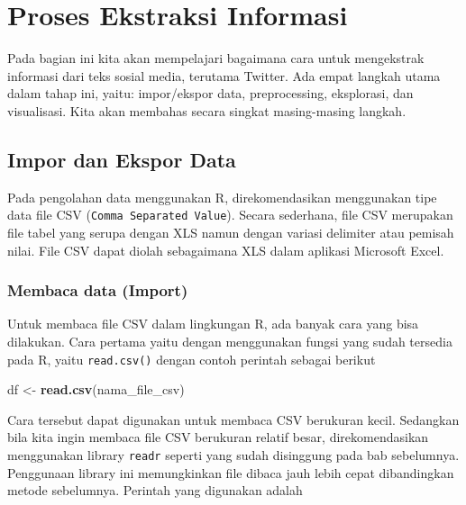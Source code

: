 \documentclass[]{book}
\newenvironment{Shaded}{\begin{snugshade}}{\end{snugshade}}
\newcommand{\KeywordTok}[1]{\textcolor[rgb]{0.13,0.29,0.53}{\textbf{#1}}}
\newcommand{\NormalTok}[1]{#1}
\newcommand{\StringTok}[1]{\textcolor[rgb]{0.31,0.60,0.02}{#1}}
\begin{document}
\hypertarget{proses-ekstraksi-informasi}{%
\chapter{Proses Ekstraksi Informasi}\label{proses-ekstraksi-informasi}}

Pada bagian ini kita akan mempelajari bagaimana cara untuk mengekstrak
informasi dari teks sosial media, terutama Twitter. Ada empat langkah
utama dalam tahap ini, yaitu: impor/ekspor data, preprocessing,
eksplorasi, dan visualisasi. Kita akan membahas secara singkat
masing-masing langkah.

\hypertarget{impor-dan-ekspor-data}{%
\section{Impor dan Ekspor Data}\label{impor-dan-ekspor-data}}

Pada pengolahan data menggunakan R, direkomendasikan menggunakan tipe
data file CSV (\texttt{Comma\ Separated\ Value}). Secara sederhana, file
CSV merupakan file tabel yang serupa dengan XLS namun dengan variasi
delimiter atau pemisah nilai. File CSV dapat diolah sebagaimana XLS
dalam aplikasi Microsoft Excel.

\hypertarget{membaca-data-import}{%
\subsection{Membaca data (Import)}\label{membaca-data-import}}

Untuk membaca file CSV dalam lingkungan R, ada banyak cara yang bisa
dilakukan. Cara pertama yaitu dengan menggunakan fungsi yang sudah
tersedia pada R, yaitu \texttt{read.csv()} dengan contoh perintah
sebagai berikut

\begin{Shaded}
\begin{Highlighting}[]
\NormalTok{df <-}\StringTok{ }\KeywordTok{read.csv}\NormalTok{(nama_file_csv)}
\end{Highlighting}
\end{Shaded}

Cara tersebut dapat digunakan untuk membaca CSV berukuran kecil.
Sedangkan bila kita ingin membaca file CSV berukuran relatif besar,
direkomendasikan menggunakan library \texttt{readr} seperti yang sudah
disinggung pada bab sebelumnya. Penggunaan library ini memungkinkan file
dibaca jauh lebih cepat dibandingkan metode sebelumnya. Perintah yang
digunakan adalah
\end{document}
